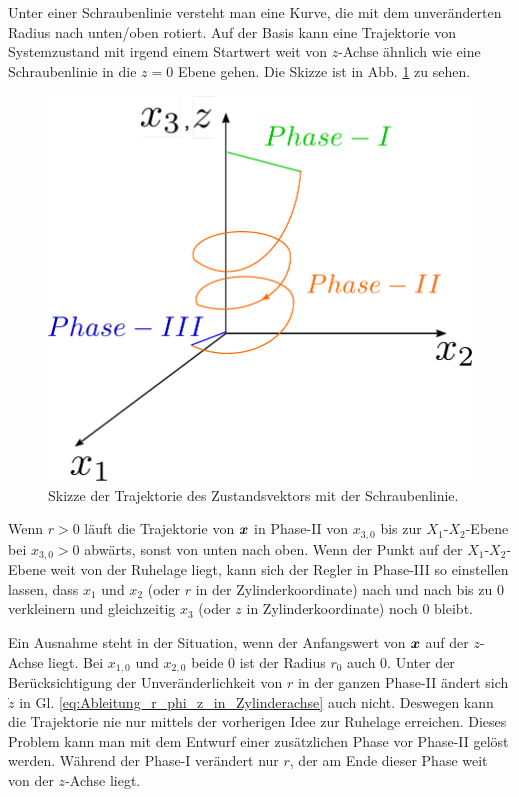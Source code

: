 Unter einer Schraubenlinie versteht man eine Kurve, die mit dem unveränderten Radius nach unten/oben rotiert. Auf der Basis kann eine Trajektorie von Systemzustand mit irgend einem Startwert weit von $z$-Achse ähnlich wie eine Schraubenlinie in die $z=0$ Ebene gehen. Die Skizze ist in Abb. \ref{fig:Schraubenlinie} zu sehen.
\begin{figure}[!h]
	\centering
	\includegraphics[width=0.4\linewidth]{bild/modul/Schraubenlinie.pdf}%
	\caption{Skizze der Trajektorie des Zustandsvektors mit der Schraubenlinie.}
	\label{fig:Schraubenlinie}
\end{figure}

Wenn $r>0$ läuft die Trajektorie von $\boldsymbol x$ in Phase-II von $x_{3,0}$ bis zur $X_{1}$-$X_{2}$-Ebene bei $x_{3,0}>0$ abwärts, sonst von unten nach oben. Wenn der Punkt auf der $X_{1}$-$X_{2}$-Ebene weit von der Ruhelage liegt, kann sich der Regler in Phase-III so einstellen lassen, dass $x_{1}$ und $x_{2}$ (oder $r$ in der Zylinderkoordinate) nach und nach bis zu $0$ verkleinern und gleichzeitig $x_{3}$ (oder $z$ in Zylinderkoordinate) noch $0$ bleibt. 

Ein Ausnahme steht in der Situation, wenn der Anfangswert von $\boldsymbol x$ auf der $z$-Achse liegt. Bei $x_{1,0}$ und $x_{2,0}$ beide $0$ ist der Radius $r_{0}$ auch $0$. Unter der Berücksichtigung der Unveränderlichkeit von $r$ in der ganzen Phase-II ändert sich $\dot{z}$ in Gl. \eqref{eq:Ableitung_r_phi_z_in_Zylinderachse} auch nicht. Deswegen kann die Trajektorie nie nur mittels der vorherigen Idee zur Ruhelage erreichen. Dieses Problem kann man mit dem Entwurf einer zusätzlichen Phase vor Phase-II gelöst werden. Während der Phase-I verändert nur $r$, der am Ende dieser Phase weit von der $z$-Achse liegt.

